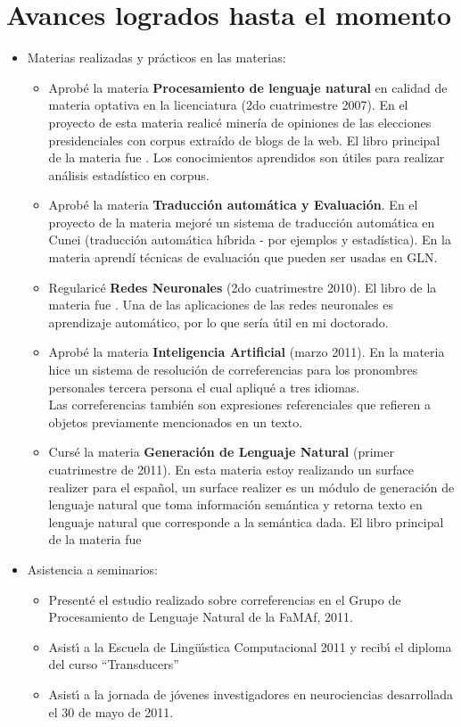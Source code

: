 \section{Avances logrados hasta el momento}
\label{progreso}
\begin{itemize}
\item Materias realizadas y pr\'acticos en las materias:
\begin{itemize}
\item Aprob\'e la materia {\bf Procesamiento de lenguaje natural} en calidad de materia optativa en la licenciatura (2do cuatrimestre 2007). En el proyecto de esta materia realic\'e miner\'ia de opiniones de las elecciones presidenciales con corpus extra\'ido de blogs de la web. El libro principal de la materia fue \cite{Manning2000}. Los conocimientos aprendidos son \'utiles para realizar an\'alisis estad\'istico en corpus.
\item Aprob\'e la materia {\bf Traducci\'on autom\'atica y Evaluaci\'on}. En el proyecto de la materia mejor\'e un sistema de traducci\'on autom\'atica en Cunei (traducci\'on autom\'atica h\'ibrida - por ejemplos y estad\'istica).
En la materia aprend\'i t\'ecnicas de evaluaci\'on que pueden ser usadas en GLN. 
\item Regularic\'e {\bf Redes Neuronales} (2do cuatrimestre 2010). El libro de la materia fue \cite{Hertz1991}. Una de las aplicaciones de las redes neuronales es aprendizaje autom\'atico, por lo que ser\'ia \'util en mi doctorado.
\item Aprob\'e la materia {\bf Inteligencia Artificial} (marzo 2011). En la materia hice un sistema de resoluci\'on de correferencias para los pronombres personales tercera persona el cual apliqu\'e a tres idiomas.\\
Las correferencias tambi\'en son expresiones referenciales que refieren a objetos previamente mencionados en un texto.
\item Curs\'e la materia {\bf Generaci\'on de Lenguaje Natural} (primer cuatrimestre de 2011). En esta materia estoy realizando un surface realizer para el espa\~{n}ol, un surface realizer es un m\'odulo de generaci\'on de lenguaje natural que toma informaci\'on sem\'antica y retorna texto en lenguaje natural que corresponde a la sem\'antica dada. El libro principal de la materia fue \cite{Reiter2000}
\end{itemize}
\item Asistencia a seminarios:
\begin{itemize}
\item Present\'e el estudio realizado sobre correferencias en el Grupo de Procesamiento de Lenguaje Natural de la FaMAf, 2011.
\item Asist\'{\i} a la Escuela de Ling\"u\'{\i}stica Computacional 2011 y recib\'{\i} el diploma del curso ``Transducers''
\item Asist\'{\i} a la jornada de j\'ovenes investigadores en neurociencias desarrollada el 30 de mayo de 2011.
\end{itemize}
\end{itemize}
